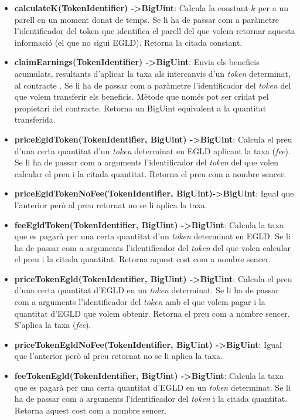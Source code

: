 \documentclass[11pt,a4paper]{article}
\begin{document}
\begin{itemize}
\item \textbf{calculateK(TokenIdentifier) -\textgreater BigUint}: Calcula la constant \(k\) per a un parell en un moment donat de temps. Se li ha de passar com a paràmetre l'identificador del token que identifica el parell del que volem retornar aquesta informació (el que no sigui EGLD). Retorna la citada constant.
\item \textbf{claimEarnings(TokenIdentifier) -\textgreater BigUint}: Envia els beneficis acumulats, resultants d'aplicar la taxa als intercanvis d'un \textit{token} determinat, al contracte . Se li ha de passar com a paràmetre l'identificador del \textit{token} del que volem transferir els beneficis. Mètode que només pot ser cridat pel propietari del contracte. Retorna un BigUint equivalent a la quantitat transferida.
\item \textbf{priceEgldToken(TokenIdentifier, BigUint) -\textgreater BigUint}: Calcula el preu d'una certa quantitat d'un \textit{token} determinat en EGLD aplicant la taxa (\textit{fee}). Se li ha de passar com a arguments l'identificador del \textit{token} del que volen calcular el preu i la citada quantitat. Retorna el preu com a nombre sencer.
\item \textbf{priceEgldTokenNoFee(TokenIdentifier, BigUint)-\textgreater BigUint}: Igual que l'anterior però al preu retornat no se li aplica la taxa.
\item \textbf{feeEgldToken(TokenIdentifier, BigUint) -\textgreater BigUint}:  Calcula la taxa que es pagarà per una certa quantitat d'un \textit{token} determinat en EGLD. Se li ha de passar com a arguments l'identificador del \textit{token} del que volen calcular el preu i la citada quantitat. Retorna aquest cost com a nombre sencer.
\item \textbf{priceTokenEgld(TokenIdentifier, BigUint) -\textgreater BigUint}: Calcula el preu d'una certa quantitat d'EGLD en un \textit{token} determinat. Se li ha de passar com a arguments l'identificador del \textit{token} amb el que volem pagar i la quantitat d'EGLD que volem obtenir. Retorna el preu com a nombre sencer. S'aplica la taxa (\textit{fee}).
\item \textbf{priceTokenEgldNoFee(TokenIdentifier, BigUint) -\textgreater BigUint}: Igual que l'anterior però al preu retornat no se li aplica la taxa.
\item \textbf{feeTokenEgld(TokenIdentifier, BigUint) -\textgreater BigUint}: Calcula la taxa que es pagarà per una certa quantitat d'EGLD en un \textit{token} determinat. Se li ha de passar com a arguments l'identificador del \textit{token} i la citada quantitat. Retorna aquest cost com a nombre sencer.

\end{itemize}
\end{document}
